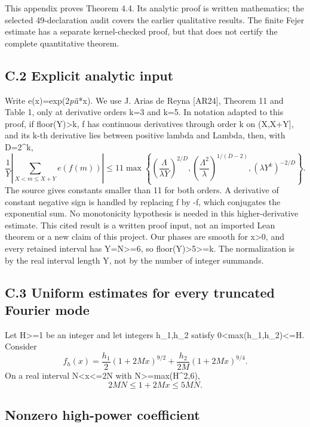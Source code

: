 \documentclass[11pt,a4paper]{article}
\begin{document}
This appendix proves Theorem 4.4. Its analytic proof is written
mathematics; the selected 49-declaration audit covers the earlier
qualitative results. The finite Fejer estimate has a separate
kernel-checked proof, but that does not certify the complete
quantitative theorem.

\subsection{C.2 Explicit analytic
input}\label{c.2-explicit-analytic-input}

Write e(x)=exp(2\emph{pi}i*x). We use J. Arias de Reyna {[}AR24{]},
Theorem 11 and Table 1, only at derivative orders k=3 and k=5. In
notation adapted to this proof, if floor(Y)\textgreater k, f has
continuous derivatives through order k on (X,X+Y{]}, and its k-th
derivative lies between positive lambda and Lambda, then, with D=2\^{}k,
\[
\frac1Y\left|\sum_{X<m\le X+Y}e(f(m))\right|
\le 11\max\left\{
 \left(\frac{\Lambda}{\lambda Y}\right)^{2/D},
 \left(\frac{\Lambda^2}{\lambda}\right)^{1/(D-2)},
 (\lambda Y^k)^{-2/D}\right\}. \tag{C.5}
\] The source gives constants smaller than 11 for both orders. A
derivative of constant negative sign is handled by replacing f by -f,
which conjugates the exponential sum. No monotonicity hypothesis is
needed in this higher-derivative estimate. This cited result is a
written proof input, not an imported Lean theorem or a new claim of this
project. Our phases are smooth for x\textgreater0, and every retained
interval has Y=N\textgreater=6, so floor(Y)\textgreater5\textgreater=k.
The normalization is by the real interval length Y, not by the number of
integer summands.

\subsection{C.3 Uniform estimates for every truncated Fourier
mode}\label{c.3-uniform-estimates-for-every-truncated-fourier-mode}

Let H\textgreater=1 be an integer and let integers h\_1,h\_2 satisfy
0\textless max(\textbar h\_1\textbar,\textbar h\_2\textbar)\textless=H.
Consider \[
f_h(x)=\frac{h_1}{2}(1+2Mx)^{9/2}
       +\frac{h_2}{2M}(1+2Mx)^{9/4}. \tag{C.6}
\] On a real interval N\textless x\textless=2N with
N\textgreater=max(H\^{}2,6), \[
2MN\le1+2Mx\le5MN. \tag{C.7}
\]

\subsection{Nonzero high-power
coefficient}\label{nonzero-high-power-coefficient}
\end{document}
